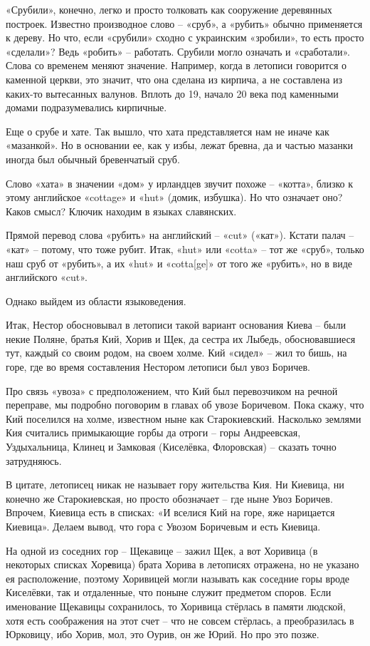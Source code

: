 «Срубили», конечно, легко и просто толковать как сооружение деревянных построек. Известно производное слово – «сруб», а «рубить» обычно применяется к дереву. Но что, если «срубили» сходно с украинским «зробили», то есть просто «сделали»? Ведь «робить» – работать. Срубили могло означать и «сработали». Слова со временем меняют значение. Например, когда в летописи говорится о каменной церкви, это значит, что она сделана из кирпича, а не составлена из каких-то вытесанных валунов. Вплоть до 19, начало 20 века под каменными домами подразумевались кирпичные.

Еще о срубе и хате. Так вышло, что хата представляется нам не иначе как «мазанкой». Но в основании ее, как у избы, лежат бревна, да и частью мазанки иногда был обычный бревенчатый сруб.

Слово «хата» в значении «дом» у ирландцев звучит похоже – «котта», близко к этому английское «cottage» и «hut» (домик, избушка). Но что означает оно? Каков смысл? Ключик находим в языках славянских.

Прямой перевод слова «рубить» на английский – «cut» («кат»). Кстати палач – «кат» – потому, что тоже рубит. Итак, «hut» или «cotta» – тот же «сруб», только наш сруб от «рубить», а их «hut» и «cotta[ge]» от того же «рубить», но в виде английского «cut».

Однако выйдем из области языковедения.

Итак, Нестор обосновывал в летописи такой вариант основания Киева – были некие Поляне, братья Кий, Хорив и Щек, да сестра их Лыбедь, обосновавшиеся тут, каждый со своим родом, на своем холме. Кий «сидел» – жил то бишь, на горе, где во время составления Нестором летописи был увоз Боричев.

Про связь «увоза» с предположением, что Кий был перевозчиком на речной переправе, мы подробно поговорим в главах об увозе Боричевом. Пока скажу, что Кий поселился на холме, известном ныне как Старокиевский. Насколько землями Кия считались примыкающие горбы да отроги – горы Андреевская, Уздыхальница, Клинец и Замковая (Киселёвка, Флоровская) – сказать точно затрудняюсь. 

В цитате, летописец никак не называет гору жительства Кия. Ни Киевица, ни конечно же Старокиевская, но просто обозначает – где ныне Увоз Боричев. Впрочем, Киевица есть в списках: «И вселися Кий на горе, яже нарицается Киевица». Делаем вывод, что гора с Увозом Боричевым и есть Киевица.

На одной из соседних гор – Щекавице – зажил Щек, а вот Хоривица (в некоторых списках Хор\textbf{е}вица) брата Хорива в летописях отражена, но не указано ея расположение, поэтому Хоривицей могли называть как соседние горы вроде Киселёвки, так и отдаленные, что поныне служит предметом споров. Если именование Щекавицы сохранилось, то Хоривица стёрлась в памяти людской, хотя есть соображения на этот счет – что не совсем стёрлась, а преобразилась в Юрковицу, ибо Хорив, мол, это Оурив, он же Юрий. Но про это позже.

